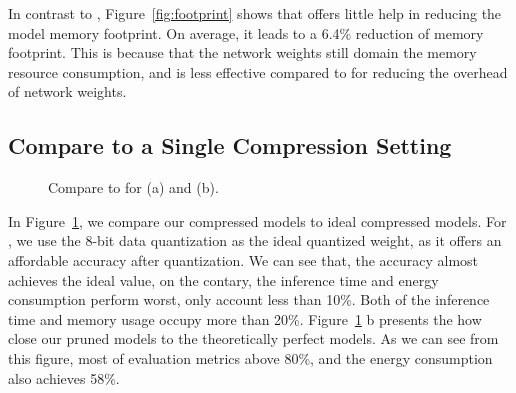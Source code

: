 In contrast to \dquantization, Figure~\ref{fig:footprint} shows that  \pruning offers little help in reducing the model memory footprint.
On average, it leads to a 6.4\% reduction of memory footprint. This is because that the network weights still domain the memory resource
consumption, and \pruning is less effective compared to \dquantization for reducing the overhead of network weights.



\subsection{Compare to a Single Compression Setting\label{sec:single}}

\begin{figure}[!t]
\centering

\hfill
{}
\hfill

\caption{Compare to  for \quantization (a) and \pruning (b).} \label{fig:oracle}
\end{figure}


In Figure~\ref{fig:oracle}, we compare our compressed models to ideal compressed models.
For \quantization, we use the 8-bit data quantization as the ideal
quantized weight,
as it offers an affordable accuracy after quantization.
We can see that,  the accuracy almost achieves the ideal value, on the
contary, the inference time and energy consumption perform worst, only account less than 10\%. Both of the inference time and memory usage
occupy more than 20\%. Figure~\ref{fig:oracle} b presents the how close our pruned models to the theoretically perfect models. As we can
see from this figure, most of evaluation metrics above 80\%, and the energy consumption also achieves 58\%.

